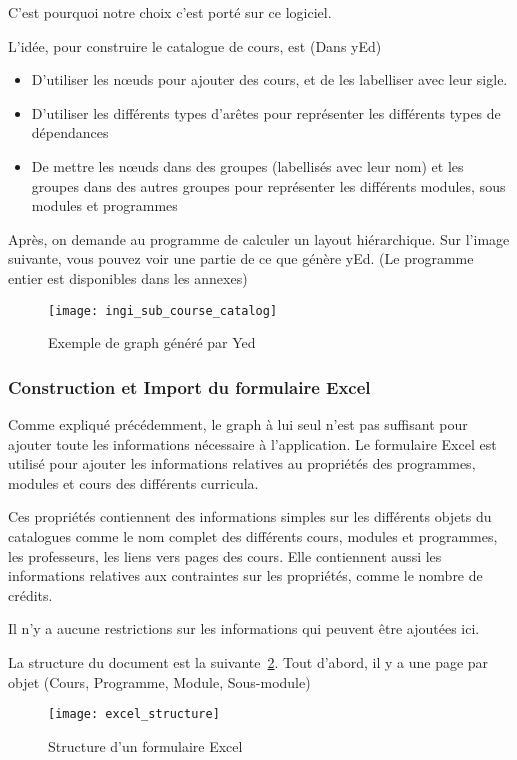 C'est pourquoi notre choix c'est porté sur ce logiciel.

L'idée, pour construire le catalogue de cours, est (Dans yEd)
\begin{itemize}
\item D'utiliser les nœuds pour ajouter des cours, et de les labelliser avec leur sigle.
\item D'utiliser les différents types d'arêtes pour représenter les différents types de dépendances
\item De mettre les nœuds dans des groupes (labellisés avec leur nom) et les groupes dans des autres groupes pour représenter les différents modules, sous modules et programmes
\end{itemize}

Après, on demande au programme de calculer un layout hiérarchique. Sur l'image suivante, vous pouvez voir une partie de ce que génère yEd. (Le programme entier est disponibles dans les annexes)
\begin{figure}[H]
\centering
\texttt{[image: ingi\_sub\_course\_catalog]}
\caption{Exemple de graph généré par Yed}
\label{fig:subcatalog}
\end{figure}


\subsubsection{Construction et Import du formulaire Excel}
Comme expliqué précédemment, le graph à lui seul n'est pas suffisant pour ajouter toute les informations nécessaire à l'application. Le formulaire Excel est utilisé pour ajouter les informations relatives au propriétés des programmes, modules et cours des différents curricula. 

Ces propriétés contiennent des informations simples sur les différents objets du catalogues comme le nom complet des différents cours, modules et programmes, les professeurs, les liens vers pages des cours. Elle contiennent aussi les informations relatives aux contraintes sur les propriétés, comme le nombre de crédits.

Il n'y a aucune restrictions sur les informations qui peuvent être ajoutées ici. 

La structure du document est la suivante~\ref{fig:excel_structure}. Tout d'abord, il y a une page par objet (Cours, Programme, Module, Sous-module)

\begin{figure}[H]
\centering
\caption{Structure d'un formulaire Excel}
\label{fig:excel_structure}
\texttt{[image: excel\_structure]}
\end{figure}

